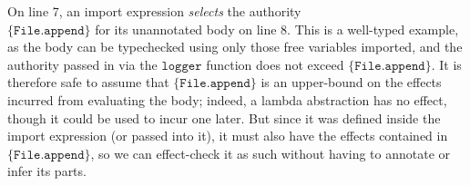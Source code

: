 \documentclass[sigplan,10pt,review]{acmart}\settopmatter{printfolios=true,printccs=false,printacmref=false}
\newcommand{\File}{\kwa{File}}
\newcommand{\kwa}[1]{\mathtt{#1}}
\newcommand{\fx}[1]{\kwa{effects}(#1)}
\begin{document}
On line 7, an import expression \textit{selects} the authority\\ $\{\kwa{File.append}\}$ for its unannotated body on line 8. This is a well-typed example, as the body can be typechecked using only those free variables imported, and the authority passed in via the $\kwa{logger}$ function does not exceed $\{\kwa{File.append}\}$. It is therefore safe to assume that $\{\kwa{File.append}\}$ is an upper-bound on the effects incurred from evaluating the body; indeed, a lambda abstraction has no effect, though it could be used to incur one later. But since it was defined inside the import expression (or passed into it), it must also have the effects contained in $\{\kwa{File.append}\}$, so we can effect-check it as such without having to annotate or infer its parts.

%
%
%
%
%
%
%
%
%
\end{document}
